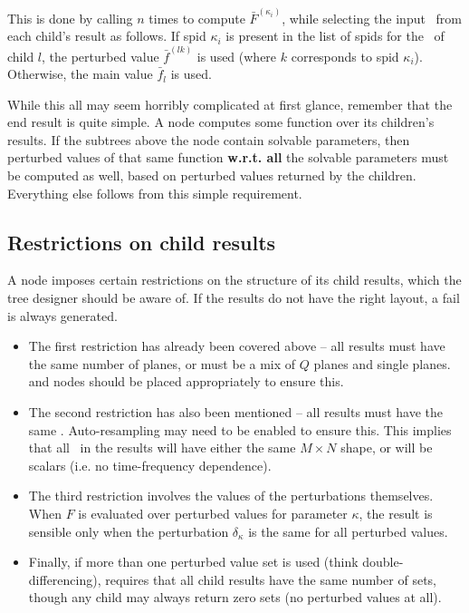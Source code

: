   This is done by calling  $n$ times to compute
  $\bar{F}^{(\kappa_i)}$, while selecting the input \Vells\ from each child's
  result as follows. If spid $\kappa_i$ is present in the list of spids for 
  the \VellSet\ of child $l$, the perturbed value $\bar{f}^{(lk)}$ is used
  (where $k$ corresponds to spid $\kappa_i$). Otherwise, the main value
  $\bar{f}_l$ is used.
  
  While this all may seem horribly complicated at first glance, remember that
  the end result is quite simple. A  node computes some function
  over its children's results. If the subtrees above the node contain solvable
  parameters, then perturbed values of that same function {\bf w.r.t. all} the
  solvable parameters must be computed as well, based on perturbed values
  returned by the children. Everything else follows from this simple
  requirement.

\subsection{Restrictions on child results}
   
  A  node imposes certain restrictions on the structure of its child
  results, which the tree designer should be aware of. If the results do not
  have the right layout, a fail is always generated.
  
  \begin{itemize}
  
  \item The first restriction has already been covered above -- all results must have
  the same number of planes, or must be a mix of $Q$ planes and single planes.
   and  nodes should be placed appropriately to ensure
  this.
  
  \item The second restriction has also been mentioned -- all results must have
  the same \Cells. Auto-resampling may need to be enabled to ensure this. This
  implies that all \Vells\ in the results will have either the same $M\times N$
  shape, or will be scalars (i.e. no time-frequency dependence).

  \item The third restriction involves the values of the perturbations
  themselves. When $F$ is evaluated over perturbed values for parameter
  $\kappa$, the result is sensible only when the perturbation $\delta_\kappa$
  is the same for all perturbed values. 

  \item Finally, if more than one perturbed value set is used (think
  double-differencing),  requires that all child results have the
  same number of sets, though any child may always return zero sets (no
  perturbed values at all).

  \end{itemize}
  
